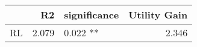 \begin{tabular}{lrlr}
\toprule
{} &    R2 & significance &  Utility Gain \\
\midrule
RL & 2.079 &     0.022 ** &         2.346 \\
\bottomrule
\end{tabular}
